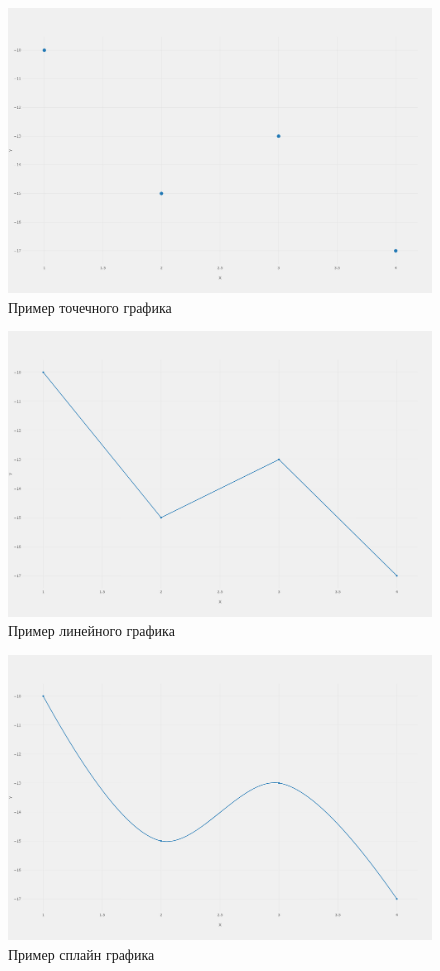 \newpage
\begin{figure}[h!]
    \center
    \includegraphics[scale=0.3]{fig/newplot (8).png}
    \caption{Пример точечного графика}
    \label{fig:13}
\end{figure}
\begin{figure}[h!]
    \center
    \includegraphics[scale=0.3]{fig/newplot (5).png}
    \caption{Пример линейного графика}
    \label{fig:14}
\end{figure}
\begin{figure}[h!]
    \center
    \includegraphics[scale=0.3]{fig/newplot (6).png}
    \caption{Пример сплайн графика}
    \label{fig:15}
\end{figure}
